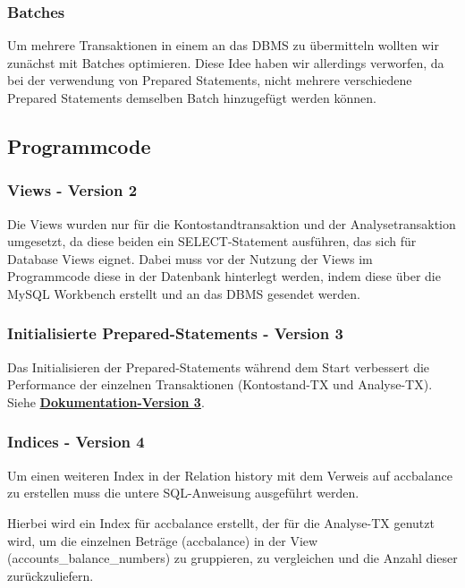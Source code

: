 \subsubsection{Batches}
    Um mehrere Transaktionen in einem an das DBMS zu übermitteln wollten wir zunächst mit Batches optimieren.
    Diese Idee haben wir allerdings verworfen, da bei der verwendung von Prepared Statements, nicht mehrere verschiedene Prepared Statements demselben Batch hinzugefügt werden können.

\subsection{Programmcode}\label{subsec:programmcode}
\subsubsection{Views - Version 2}
Die Views wurden nur für die Kontostandtransaktion und der Analysetransaktion umgesetzt, da diese beiden ein SELECT-Statement ausführen, das sich für Database Views eignet.
Dabei muss vor der Nutzung der Views im Programmcode diese in der Datenbank hinterlegt werden, indem diese über die MySQL Workbench erstellt und an das DBMS gesendet werden.



\subsubsection{Initialisierte Prepared-Statements - Version 3}
Das Initialisieren der Prepared-Statements während dem Start verbessert die Performance der einzelnen Transaktionen (Kontostand-TX und Analyse-TX).
Siehe \hyperref[subsec:version3]{\textbf{Dokumentation-Version 3}}.

\subsubsection{Indices - Version 4}
Um einen weiteren Index in der Relation history mit dem Verweis auf accbalance zu erstellen muss die untere SQL-Anweisung ausgeführt werden.

Hierbei wird ein Index für accbalance erstellt, der für die Analyse-TX genutzt wird, um die einzelnen Beträge (accbalance) in der View (accounts\_balance\_numbers) zu gruppieren, zu vergleichen und die Anzahl dieser zurückzuliefern.

